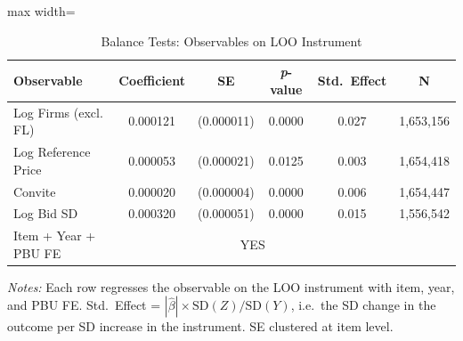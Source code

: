 \begin{table}[htbp]
\centering
\caption{Balance Tests: Observables on LOO Instrument}
\label{tab:iv_balance}
\begin{adjustbox}{max width=\textwidth}
\begin{threeparttable}
\small
\begin{tabular}{lccccc}
\toprule
Observable & Coefficient & SE & \textit{p}-value & Std.\ Effect & N \\
\midrule
Log Firms (excl. FL) & 0.000121 & (0.000011) & 0.0000 & 0.027 & 1,653,156 \\
Log Reference Price & 0.000053 & (0.000021) & 0.0125 & 0.003 & 1,654,418 \\
Convite & 0.000020 & (0.000004) & 0.0000 & 0.006 & 1,654,447 \\
Log Bid SD & 0.000320 & (0.000051) & 0.0000 & 0.015 & 1,556,542 \\
\midrule
Item + Year + PBU FE & \multicolumn{4}{c}{YES} \\
\bottomrule
\end{tabular}
\begin{tablenotes}
\small
\item \textit{Notes:} Each row regresses the observable on the LOO instrument
with item, year, and PBU FE. Std.\ Effect = $|\hat{\beta}| \times \text{SD}(Z) / \text{SD}(Y)$,
i.e.\ the SD change in the outcome per SD increase in the instrument.
SE clustered at item level.
\end{tablenotes}
\end{threeparttable}
\end{adjustbox}
\end{table}
